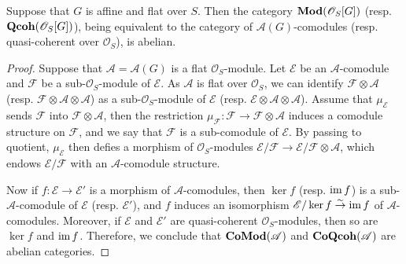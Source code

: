 \begin{proposition}\label{scheme module over flat affine group cat is abelian}
Suppose that $G$ is affine and flat over $S$. Then the category $\mathbf{Mod}(\mathscr{O}_S[G])$ (resp. $\mathbf{Qcoh}(\mathscr{O}_S[G])$), being equivalent to the category of $\mathscr{A}(G)$-comodules (resp. quasi-coherent over $\mathscr{O}_S$), is abelian.
\end{proposition}
\begin{proof}
Suppose that $\mathscr{A}=\mathscr{A}(G)$ is a flat $\mathscr{O}_S$-module. Let $\mathscr{E}$ be an $\mathscr{A}$-comodule and $\mathscr{F}$ be a sub-$\mathscr{O}_S$-module of $\mathscr{E}$. As $\mathscr{A}$ is flat over $\mathscr{O}_S$, we can identify $\mathscr{F}\otimes\mathscr{A}$ (resp. $\mathscr{F}\otimes\mathscr{A}\otimes\mathscr{A}$) as a sub-$\mathscr{O}_S$-module of $\mathscr{E}$ (resp. $\mathscr{E}\otimes\mathscr{A}\otimes\mathscr{A}$). Assume that $\mu_{\mathscr{E}}$ sends $\mathscr{F}$ into $\mathscr{F}\otimes\mathscr{A}$, then the restriction $\mu_\mathscr{F}:\mathscr{F}\to\mathscr{F}\otimes\mathscr{A}$ induces a comodule structure on $\mathscr{F}$, and we say that $\mathscr{F}$ is a sub-comodule of $\mathscr{E}$. By passing to quotient, $\mu_\mathscr{E}$ then defies a morphism of $\mathscr{O}_S$-modules $\mathscr{E}/\mathscr{F}\to\mathscr{E}/\mathscr{F}\otimes\mathscr{A}$, which endows $\mathscr{E}/\mathscr{F}$ with an $\mathscr{A}$-comodule structure.\par
Now if $f:\mathscr{E}\to\mathscr{E}'$ is a morphism of $\mathscr{A}$-comodules, then $\ker f$ (resp. $\operatorname{im} f$) is a sub-$\mathscr{A}$-comodule of $\mathscr{E}$ (resp. $\mathscr{E}'$), and $f$ induces an isomorphism $\mathscr{E}/\operatorname{ker} f\stackrel{\sim}{\to} \operatorname{im} f$ of $\mathscr{A}$-comodules. Moreover, if $\mathscr{E}$ and $\mathscr{E}'$ are quasi-coherent $\mathscr{O}_S$-modules, then so are $\ker f$ and $\operatorname{im} f$. Therefore, we conclude that $\mathbf{CoMod}(\mathscr{A})$ and $\mathbf{CoQcoh}(\mathscr{A})$ are abelian categories.
\end{proof}

